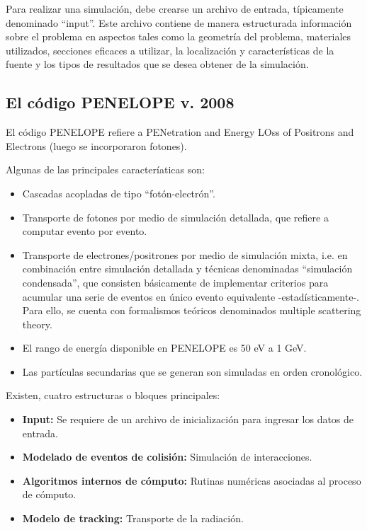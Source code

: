 Para realizar una simulación, debe crearse un archivo de entrada, típicamente denominado “input”. Este archivo contiene de manera estructurada información sobre el problema en aspectos tales como la geometría del problema, materiales utilizados, secciones eficaces a utilizar, la localización y características de la fuente y los tipos de resultados que se desea obtener de la simulación.

\subsection{El c\'odigo PENELOPE v. 2008}

El código PENELOPE refiere a PENetration and Energy LOss of Positrons and Electrons (luego se incorporaron fotones).

Algunas de las principales caracteríaticas son:

\begin{itemize}
 \item Cascadas acopladas de tipo “fotón-electrón”.
 \item Transporte de fotones por medio de simulación detallada, que refiere a computar evento por evento.
 \item Transporte de electrones/positrones por medio de simulación mixta, i.e. en combinación entre simulación detallada y técnicas denominadas “simulación condensada”, que consisten básicamente de implementar criterios para acumular una serie de eventos en único evento equivalente -estadísticamente-. Para ello, se cuenta con formalismos teóricos denominados multiple scattering theory.
 \item El rango de energía disponible en PENELOPE es 50 eV a 1 GeV.
 \item Las partículas secundarias que se generan son simuladas en orden cronológico.
\end{itemize}

Existen, cuatro estructuras o bloques principales:

\begin{itemize}
 \item {\bf Input:} Se requiere de un archivo de inicialización para ingresar los datos de entrada.
 \item {\bf Modelado de eventos de colisión:} Simulación de interacciones.
 \item {\bf Algoritmos internos de cómputo:} Rutinas numéricas asociadas al proceso de cómputo.
 \item {\bf Modelo de tracking:} Transporte de la radiación.
\end{itemize}

